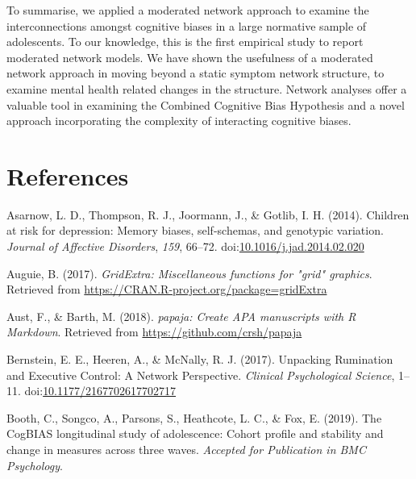 \documentclass[man,floatsintext]{apa6}
\begin{document}
To summarise, we applied a moderated network approach to examine the interconnections amongst cognitive biases in a large normative sample of adolescents. To our knowledge, this is the first empirical study to report moderated network models. We have shown the usefulness of a moderated network approach in moving beyond a static symptom network structure, to examine mental health related changes in the structure. Network analyses offer a valuable tool in examining the Combined Cognitive Bias Hypothesis and a novel approach incorporating the complexity of interacting cognitive biases.

\newpage

\hypertarget{references}{%
\section{References}\label{references}}

\begingroup
\setlength{\parindent}{-0.5in}
\setlength{\leftskip}{0.5in}
\setlength{\parskip}{8pt}

\hypertarget{refs}{}
\leavevmode\hypertarget{ref-asarnow_children_2014}{}%
Asarnow, L. D., Thompson, R. J., Joormann, J., \& Gotlib, I. H. (2014). Children at risk for depression: Memory biases, self-schemas, and genotypic variation. \emph{Journal of Affective Disorders}, \emph{159}, 66--72. doi:\href{https://doi.org/10.1016/j.jad.2014.02.020}{10.1016/j.jad.2014.02.020}

\leavevmode\hypertarget{ref-R-gridExtra}{}%
Auguie, B. (2017). \emph{GridExtra: Miscellaneous functions for "grid" graphics}. Retrieved from \url{https://CRAN.R-project.org/package=gridExtra}

\leavevmode\hypertarget{ref-R-papaja}{}%
Aust, F., \& Barth, M. (2018). \emph{papaja: Create APA manuscripts with R Markdown}. Retrieved from \url{https://github.com/crsh/papaja}

\leavevmode\hypertarget{ref-bernstein_unpacking_2017}{}%
Bernstein, E. E., Heeren, A., \& McNally, R. J. (2017). Unpacking Rumination and Executive Control: A Network Perspective. \emph{Clinical Psychological Science}, 1--11. doi:\href{https://doi.org/10.1177/2167702617702717}{10.1177/2167702617702717}

\leavevmode\hypertarget{ref-booth_cogbias_2019}{}%
Booth, C., Songco, A., Parsons, S., Heathcote, L. C., \& Fox, E. (2019). The CogBIAS longitudinal study of adolescence: Cohort profile and stability and change in measures across three waves. \emph{Accepted for Publication in BMC Psychology}.
\end{document}
